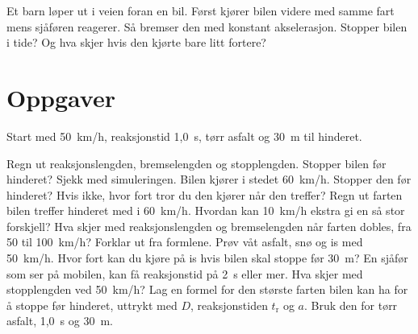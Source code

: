 \documentclass[11pt]{article}
\begin{document}

Et barn løper ut i veien foran en bil. Først kjører bilen videre med samme fart mens sjåføren reagerer. Så bremser den med konstant akselerasjon. Stopper bilen i tide? Og hva skjer hvis den kjørte bare litt fortere?

\section*{Oppgaver}

Start med 50~km/h, reaksjonstid 1,0~s, tørr asfalt og 30~m til hinderet.

\begin{oppgaveliste}
\oppgave {}Regn ut reaksjonslengden, bremselengden og stopplengden. Stopper bilen før hinderet? Sjekk med simuleringen.
\svar
\oppgave {}Bilen kjører i stedet 60~km/h. Stopper den før hinderet? Hvis ikke, hvor fort tror du den kjører når den treffer?
\svar
\oppgave {}Regn ut farten bilen treffer hinderet med i 60~km/h. Hvordan kan 10~km/h ekstra gi en så stor forskjell?
\svar
\oppgave {}Hva skjer med reaksjonslengden og bremselengden når farten dobles, fra 50 til 100~km/h? Forklar ut fra formlene.
\svar
\oppgave {}Prøv våt asfalt, snø og is med 50~km/h. Hvor fort kan du kjøre på is hvis bilen skal stoppe før 30~m?
\svar
\oppgave {}En sjåfør som ser på mobilen, kan få reaksjonstid på 2~s eller mer. Hva skjer med stopplengden ved 50~km/h?
\svar
\oppgave {}Lag en formel for den største farten bilen kan ha for å stoppe før hinderet, uttrykt med $D$, reaksjonstiden $t_{\mathrm{r}}$ og $a$. Bruk den for tørr asfalt, 1,0~s og 30~m.
\svar
\end{oppgaveliste}
\end{document}
